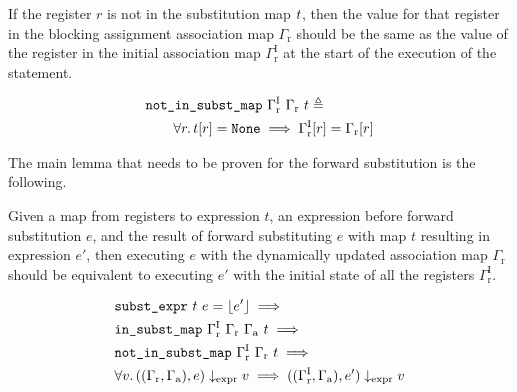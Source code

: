 \begin{definition}%
  \label{def:hg:not-in-substitution-map}

  If the register $r$ is not in the substitution map $t$, then the value
  for that register in the blocking assignment association map
  $\Gamma_{\mathrm r}$ should be the same as the value of the register in the
  initial association map $\Gamma^{\mathrm{I}}_{\mathrm r}$ at the start of the
  execution of the statement.

  \begin{equation*}
    \begin{aligned}
      &\texttt{not\_in\_subst\_map}\ \Gamma^{\mathrm{I}}_{\mathrm r}\ \Gamma_{\mathrm r}\ t
      \triangleq \\
      &\qquad\forall r\ldotp t\!\left[r\right] = \texttt{None} \implies \Gamma^{\mathrm{I}}_{\mathrm r}\!\left[r\right] =
      \Gamma_{\mathrm r}\!\left[r\right]
    \end{aligned}
  \end{equation*}
\end{definition}

The main lemma that needs to be proven for the forward substitution is the
following.

\begin{lemma}%
  \label{lem:hg:forward-substitution-of-expressions}

  Given a map from registers to expression $t$, an expression before forward
  substitution $e$, and the result of forward substituting $e$ with map $t$
  resulting in expression $e'$, then executing $e$ with the dynamically updated
  association map $\Gamma_{\mathrm r}$ should be equivalent to executing $e'$
  with the initial state of all the registers $\Gamma^{\mathrm{I}}_{\mathrm r}$.

  {\normalfont
    \begin{equation*}
      \begin{aligned}
        &\texttt{subst\_expr}\ t\ e = \lfloor e' \rfloor \implies \\
        &\texttt{in\_subst\_map}\ \Gamma^{\mathrm{I}}_{\mathrm r}\ \Gamma_{\mathrm r}\ \Gamma_{\mathrm a}\ t \implies\\
        &\texttt{not\_in\_subst\_map}\ \Gamma^{\mathrm{I}}_{\mathrm r}\ \Gamma_{\mathrm r}\ t \implies\\
        &\forall v\ldotp ((\Gamma_{\mathrm r}, \Gamma_{\mathrm a}), e) \downarrow_{\text{expr}} v
          \implies ((\Gamma^{\mathrm{I}}_{\mathrm r}, \Gamma_{\mathrm a}), e') \downarrow_{\text{expr}} v
      \end{aligned}
    \end{equation*}}
\end{lemma}

